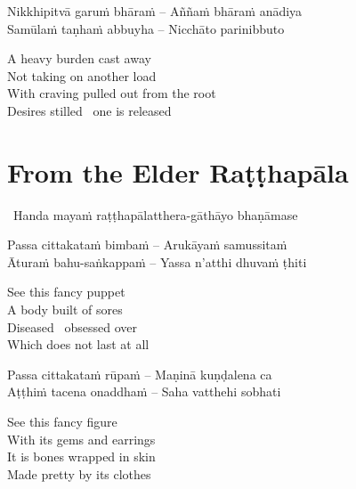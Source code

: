 \begin{verses}
  Nikkhipitvā garuṁ bhāraṁ – Aññaṁ bhāraṁ anādiya\\
  Samūlaṁ taṇhaṁ abbuyha – Nicchāto parinibbuto
\end{verses}

\begin{english-verses}
  A heavy burden cast away\\
  Not taking on another load\\
  With craving pulled out from the root\\
  Desires stilled \breathmark\ one is released
\end{english-verses}

\suttaRef{[SN 22.22]}




\section{From the Elder Raṭṭhapāla}
\label{ratthapala}

\begin{leader}
  \anglebracketleft\ \hspace{-0.5mm}Handa mayaṁ raṭṭhapālatthera-gāthāyo bhaṇāmase \hspace{-0.5mm}\anglebracketright\
\end{leader}

\begin{verses}
  Passa cittakataṁ bimbaṁ – Arukāyaṁ samussitaṁ\\
  Āturaṁ bahu-saṅkappaṁ – Yassa n'atthi dhuvaṁ ṭhiti
\end{verses}

\begin{english-verses}
  See this fancy puppet\\
  A body built of sores\\
  Diseased \breathmark\ obsessed over\\
  Which does not last at all
\end{english-verses}

\begin{verses}
  Passa cittakataṁ rūpaṁ – Maṇinā kuṇḍalena ca\\
  Aṭṭhiṁ tacena onaddhaṁ – Saha vatthehi sobhati
\end{verses}

\begin{english-verses}
  See this fancy figure\\
  With its gems and earrings\\
  It is bones wrapped in skin\\
  Made pretty by its clothes
\end{english-verses}


